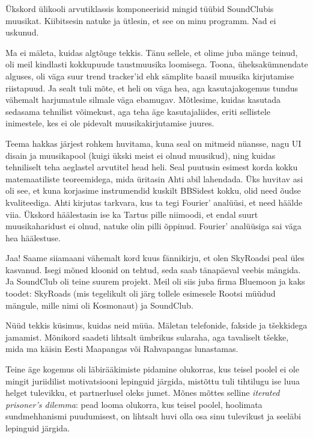 Ükskord ülikooli arvutiklassis komponeerisid mingid tüübid 
SoundClubis muusikat. 
Kiibitsesin natuke ja ütlesin, et see on minu programm. Nad ei uskunud. 

Ma ei mäleta, kuidas algtõuge tekkis. Tänu sellele, et olime juba mänge 
teinud, oli meil kindlasti kokkupuude taustmuusika loomisega. 
Toona, üheksakümnendate alguses, oli väga suur trend tracker'id ehk 
sämplite baasil muusika kirjutamise riistapuud. Ja 
sealt tuli mõte, et heli on väga hea, aga kasutajakogemus tundus vähemalt 
harjumatule silmale väga ebamugav. Mõtlesime, kuidas kasutada sedasama 
tehnilist võimekust, aga teha äge kasutajaliides, eriti sellistele inimestele, 
kes ei ole pidevalt muusikakirjutamise juures.

Teema hakkas järjest rohkem huvitama, kuna seal on mitmeid nüansse, nagu UI 
disain ja muusikapool (kuigi ükski meist ei olnud muusikud), ning
kuidas tehniliselt teha aeglastel arvutitel head heli. Seal puutusin esimest 
korda kokku matemaatiliste teoreemidega, mida üritasin
Ahti abil lahendada. Üks huvitav asi oli see, 
et kuna korjasime instrumendid kuskilt BBSidest kokku, olid 
need õudse kvaliteediga. Ahti kirjutas tarkvara, kus ta 
tegi Fourier' analüüsi, et need häälde viia. Ükskord 
häälestasin ise ka Tartus pille niimoodi, et endal suurt muusikaharidust ei olnud, 
natuke olin pilli õppinud. Fourier' analüüsiga sai väga hea häälestuse. 


Jaa! Saame siiamaani vähemalt kord kuus 
fännikirju, et olen SkyRoadsi peal üles kasvanud. Isegi mõned 
kloonid on tehtud, seda saab tänapäeval veebis mängida. Ja SoundClub oli teine 
suurem projekt. Meil oli siis juba firma Bluemoon ja kaks toodet: 
SkyRoads (mis tegelikult oli järg tollele esimesele Rootsi müüdud mängule, 
mille nimi oli Kosmonaut) ja SoundClub. 

Nüüd tekkis küsimus, kuidas neid müüa. Mäletan
telefonide, fakside ja tšekkidega jamamist. Mõnikord 
saadeti lihtsalt ümbrikus sularaha, aga tavaliselt tšekke, mida ma 
käisin Eesti Maapangas või Rahvapangas lunastamas. 

Teine äge kogemus oli läbirääkimiste pidamine 
olukorras, kus teisel poolel ei ole mingit juriidilist motivatsiooni 
lepinguid järgida, mistõttu tuli tihtilugu ise
luua helget tulevikku, et partnerlusel oleks jumet. Mõnes mõttes 
selline \emph{iterated prisoner's dilemma}: pead looma olukorra, kus teisel poolel, hoolimata sundmehhanismi puudumisest, on lihtsalt huvi olla osa sinu tulevikust ja 
seeläbi lepinguid järgida.


